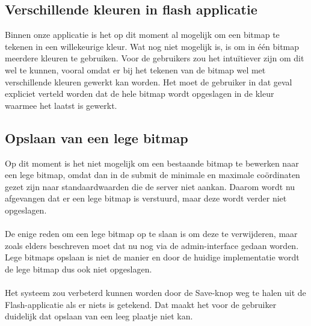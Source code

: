 \subsection{Verschillende kleuren in flash applicatie} %
Binnen onze applicatie is het op dit moment al mogelijk om een bitmap te tekenen in een willekeurige kleur. 
Wat nog niet mogelijk is, is om in \'{e}\'{e}n bitmap meerdere kleuren te gebruiken.
Voor de gebruikers zou het intu\"{i}tiever zijn om dit wel te kunnen, vooral omdat er bij het tekenen van de bitmap wel met verschillende kleuren gewerkt kan worden.
Het moet de gebruiker in dat geval expliciet verteld worden dat de hele bitmap wordt opgeslagen in de kleur waarmee het laatst is gewerkt.


\subsection{Opslaan van een lege bitmap} %
Op dit moment is het niet mogelijk om een bestaande bitmap te bewerken naar een lege bitmap, omdat dan in de submit de minimale en maximale co\"ordinaten gezet zijn naar standaardwaarden die de server niet aankan. Daarom wordt nu afgevangen dat er een lege bitmap is verstuurd, maar deze wordt verder niet opgeslagen.
\\
\\
De enige reden om een lege bitmap op te slaan is om deze te verwijderen, maar zoals elders beschreven moet dat nu nog via de admin-interface gedaan worden. Lege bitmaps opslaan is niet de manier en door de huidige implementatie wordt de lege bitmap dus ook niet opgeslagen.
\\
\\
Het systeem zou verbeterd kunnen worden door de Save-knop weg te halen uit de Flash-applicatie als er niets is getekend. Dat maakt het voor de gebruiker duidelijk dat opslaan van een leeg plaatje niet kan.


